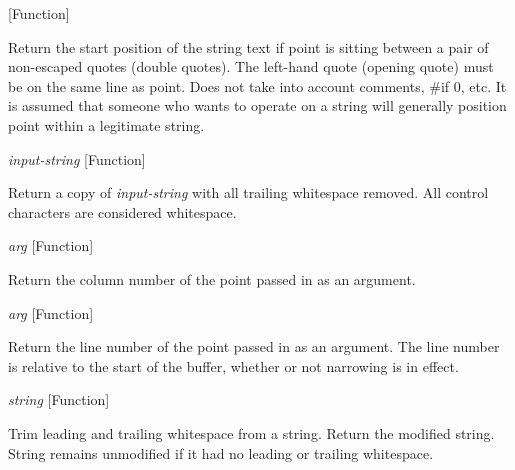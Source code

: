 \vspace{1em}
\noindent
{}
\usebox{\funcname}
 \hfill [Function]

\begin{doc-string}
Return the start position of the string text if point is sitting between a pair
of non-escaped quotes (double quotes).  The left-hand quote (opening quote) must be
on the same line as point.  Does not take into account comments, \#if 0, etc.  It is
assumed that someone who wants to operate on a string will generally position point
within a legitimate string.
\end{doc-string}

\vspace{1em}
\noindent
{}
\usebox{\funcname}\emph{input-string}
 \hfill [Function]

\begin{doc-string}
Return a copy of \emph{input-string} with all trailing whitespace removed.  All control
characters are considered whitespace.
\end{doc-string}

\vspace{1em}
\noindent
{}
\usebox{\funcname}\emph{arg}
 \hfill [Function]

\begin{doc-string}
Return the column number of the point passed in as an argument.
\end{doc-string}

\vspace{1em}
\noindent
{}
\usebox{\funcname}\emph{arg}
 \hfill [Function]

\begin{doc-string}
Return the line number of the point passed in as an argument.  The line number is
relative to the start of the buffer, whether or not narrowing is in effect.
\end{doc-string}

\vspace{1em}
\noindent
{}
\usebox{\funcname}\emph{string}
 \hfill [Function]

\begin{doc-string}
Trim leading and trailing whitespace from a string.  Return the modified
string.  String remains unmodified if it had no leading or trailing whitespace.
\end{doc-string}

